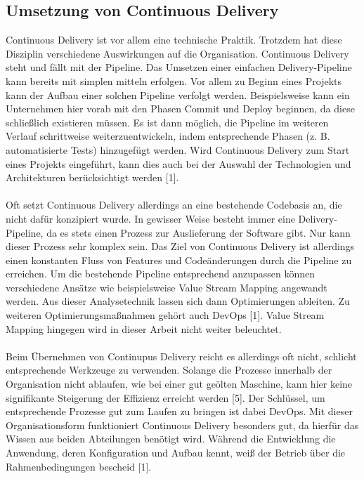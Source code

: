 \subsection{Umsetzung von Continuous Delivery}
Continuous Delivery ist vor allem eine technische Praktik. Trotzdem hat diese Disziplin verschiedene Auswirkungen auf die Organisation. Continuous Delivery steht und fällt mit der Pipeline. Das Umsetzen einer einfachen Delivery-Pipeline kann bereits mit simplen mitteln erfolgen. Vor allem zu Beginn eines Projekts kann der Aufbau einer solchen Pipeline verfolgt werden. Beispielsweise kann ein Unternehmen hier vorab mit den Phasen Commit und Deploy beginnen, da diese schließlich existieren müssen. Es ist dann möglich, die Pipeline im weiteren Verlauf schrittweise weiterzuentwickeln, indem entsprechende Phasen (z. B. automatisierte Tests) hinzugefügt werden. Wird Continuous Delivery zum Start eines Projekts eingeführt, kann dies auch bei der Auswahl der Technologien und Architekturen berücksichtigt werden [1]. \\ \\
Oft setzt Continuous Delivery allerdings an eine bestehende Codebasis an, die nicht dafür konzipiert wurde. In gewisser Weise besteht immer eine Delivery-Pipeline, da es stets einen Prozess zur Auslieferung der Software gibt. Nur kann dieser Prozess sehr komplex sein. Das Ziel von Continuous Delivery ist allerdings einen konstanten Fluss von Features und Codeänderungen durch die Pipeline zu erreichen. Um die bestehende Pipeline entsprechend anzupassen können verschiedene Ansätze wie beispielsweise Value Stream Mapping angewandt werden. Aus dieser Analysetechnik lassen sich dann Optimierungen ableiten. Zu weiteren Optimierungsmaßnahmen gehört auch DevOps [1]. Value Stream Mapping hingegen wird in dieser Arbeit nicht weiter beleuchtet. \\ \\
Beim Übernehmen von Continupus Delivery reicht es allerdings oft nicht, schlicht entsprechende Werkzeuge zu verwenden. Solange die Prozesse innerhalb der Organisation nicht ablaufen, wie bei einer gut geölten Maschine, kann hier keine signifikante Steigerung der Effizienz erreicht werden [5]. Der Schlüssel, um entsprechende Prozesse gut zum Laufen zu bringen ist dabei DevOps. Mit dieser Organisationsform funktioniert Continuous Delivery besonders gut, da hierfür das Wissen aus beiden Abteilungen benötigt wird. Während die Entwicklung die Anwendung, deren Konfiguration und Aufbau kennt, weiß der Betrieb über die Rahmenbedingungen bescheid [1].


